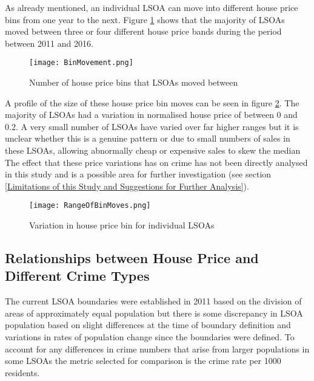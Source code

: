 \documentclass{article}
\begin{document}
As already mentioned, an individual LSOA can move into different house price bins from one year to the next. Figure \ref{fig:BinMovement} shows that the majority of LSOAs moved between three or four different house price bands during the period between 2011 and 2016.
\newline

\begin{figure}[H]
\begin{center}
  \texttt{[image: BinMovement.png]}
  \caption{Number of house price bins that LSOAs moved between}
  \label{fig:BinMovement}
\end{center}
\end{figure}
\bigskip

A profile of the size of these house price bin moves can be seen in figure \ref{fig:RangeOfBinMoves}. The majority of LSOAs had a variation in normalised house price of between 0 and 0.2. A very small number of LSOAs have varied over far higher ranges but it is unclear whether this is a genuine pattern or due to small numbers of sales in these LSOAs, allowing abnormally cheap or expensive sales to skew the median
\newline
The effect that these price variations has on crime has not been directly analysed in this study and is a possible area for further investigation (see section \ref{Limitations of this Study and Suggestions for Further Analysis}).

\begin{figure}[H]
\begin{center}
  \texttt{[image: RangeOfBinMoves.png]}
  \caption{Variation in house price bin for individual LSOAs}
  \label{fig:RangeOfBinMoves}
\end{center}
\end{figure}

\subsection{Relationships between House Price and Different Crime Types} \label{Relationships between House Price and Different Crime Types}
The current LSOA boundaries were established in 2011 based on the division of areas of approximately equal population but there is some discrepancy in LSOA population based on slight differences at the time of boundary definition and variations in rates of population change since the boundaries were defined. To account for any differences in crime numbers that arise from larger populations in some LSOAs the metric selected for comparison is the crime rate per 1000 residents.
\newline
\end{document}
